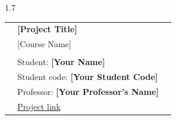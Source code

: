 \begin{center}

\vspace*{1cm}

\vspace*{2cm}

\vspace*{0.1in}
  

\begin{spacing}{1.7}

\begin{tabular}{p{1cm} ll}

& \textbf{\huge [Project Title]}\\ %
& \large [Course Name] \\

& \\
& \large Student: \textbf{[Your Name]}\\
& \large Student code: \textbf{[Your Student Code]} \\
& \large Professor: \textbf{[Your Professor's Name]} \\
    & \large \href{[Link to your project repo]}{Project link}\\

\end{tabular}

\end{spacing}

\end{center}



\thispagestyle{empty} %
\clearpage\setcounter{page}{1} %
